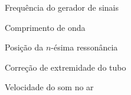 \documentclass[
  12pt,            %
  oneside,         %
  a4paper,
  english,         %
  brazilian,       %
]{abntex2}
\begin{document}
\begin{simbolos}
  \item[$f$] Frequência do gerador de sinais
  \item[$\lambda$] Comprimento de onda
  \item[$L_n$] Posição da $n$-ésima ressonância
  \item[$e$] Correção de extremidade do tubo
  \item[$v$] Velocidade do som no ar
\end{simbolos}

\tableofcontents*
\cleardoublepage

\textual







\postextual



\begin{apendicesenv}
  \partapendices
  
\end{apendicesenv}
\end{document}
